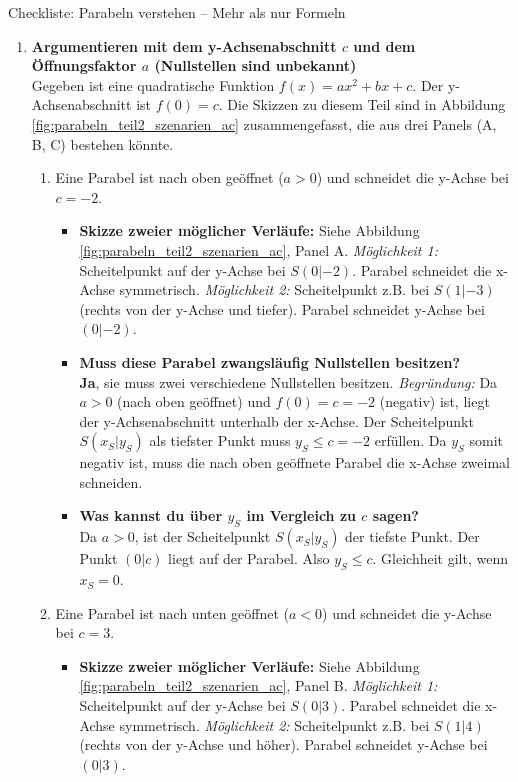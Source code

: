 \begin{loesungsumgebung}{Checkliste: Parabeln verstehen – Mehr als nur Formeln}
\begin{enumerate}[label=\textbf{Teil \arabic*:}]
    \item \textbf{Argumentieren mit dem y-Achsenabschnitt $c$ und dem Öffnungsfaktor $a$ (Nullstellen sind unbekannt)} \\
    Gegeben ist eine quadratische Funktion $f(x)=ax^2+bx+c$. Der y-Achsenabschnitt ist $f(0)=c$.
    Die Skizzen zu diesem Teil sind in Abbildung \ref{fig:parabeln_teil2_szenarien_ac} zusammengefasst, die aus drei Panels (A, B, C) bestehen könnte.

    \begin{enumerate}[label=(\alph*)]
        \item Eine Parabel ist nach oben geöffnet ($a > 0$) und schneidet die y-Achse bei $c = -2$.
        \begin{itemize}
            \item \textbf{Skizze zweier möglicher Verläufe:} Siehe Abbildung \ref{fig:parabeln_teil2_szenarien_ac}, Panel A.
            \textit{Möglichkeit 1:} Scheitelpunkt auf der y-Achse bei $S(0|-2)$. Parabel schneidet die x-Achse symmetrisch.
            \textit{Möglichkeit 2:} Scheitelpunkt z.B. bei $S(1|-3)$ (rechts von der y-Achse und tiefer). Parabel schneidet y-Achse bei $(0|-2)$.

            \item \textbf{Muss diese Parabel zwangsläufig Nullstellen besitzen?} \\
            \textbf{Ja}, sie muss zwei verschiedene Nullstellen besitzen.
            \textit{Begründung:} Da $a>0$ (nach oben geöffnet) und $f(0)=c=-2$ (negativ) ist, liegt der y-Achsenabschnitt unterhalb der x-Achse. Der Scheitelpunkt $S(x_S|y_S)$ als tiefster Punkt muss $y_S \le c = -2$ erfüllen. Da $y_S$ somit negativ ist, muss die nach oben geöffnete Parabel die x-Achse zweimal schneiden.

            \item \textbf{Was kannst du über $y_S$ im Vergleich zu $c$ sagen?} \\
            Da $a>0$, ist der Scheitelpunkt $S(x_S|y_S)$ der tiefste Punkt. Der Punkt $(0|c)$ liegt auf der Parabel. Also $y_S \le c$. Gleichheit gilt, wenn $x_S=0$.
        \end{itemize}

        \item Eine Parabel ist nach unten geöffnet ($a < 0$) und schneidet die y-Achse bei $c = 3$.
        \begin{itemize}
            \item \textbf{Skizze zweier möglicher Verläufe:} Siehe Abbildung \ref{fig:parabeln_teil2_szenarien_ac}, Panel B.
            \textit{Möglichkeit 1:} Scheitelpunkt auf der y-Achse bei $S(0|3)$. Parabel schneidet die x-Achse symmetrisch.
            \textit{Möglichkeit 2:} Scheitelpunkt z.B. bei $S(1|4)$ (rechts von der y-Achse und höher). Parabel schneidet y-Achse bei $(0|3)$.


\end{itemize}
\end{enumerate}
\end{enumerate}
\end{loesungsumgebung}

